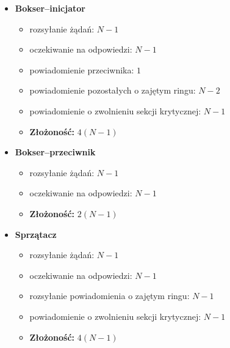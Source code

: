 \documentclass{article}
\begin{document}
\begin{itemize}
\item \textbf{Bokser--inicjator}
  \begin{itemize}
  \item rozsyłanie żądań: $N - 1$
  \item oczekiwanie na odpowiedzi: $N - 1$
  \item powiadomienie przeciwnika: $1$
  \item powiadomienie pozostałych o zajętym ringu: $N - 2$
  \item powiadomienie o zwolnieniu sekcji krytycznej: $N - 1$
  \item \textbf{Złożoność:} $4(N - 1)$
  \end{itemize}
\item \textbf{Bokser--przeciwnik}
  \begin{itemize}
  \item rozsyłanie żądań: $N - 1$
  \item oczekiwanie na odpowiedzi: $N - 1$
  \item \textbf{Złożoność:} $2(N - 1)$
  \end{itemize}
\item \textbf{Sprzątacz}
  \begin{itemize}
  \item rozsyłanie żądań: $N - 1$
  \item oczekiwanie na odpowiedzi: $N - 1$
  \item rozsyłanie powiadomienia o zajętym ringu: $N - 1$
  \item powiadomienie o zwolnieniu sekcji krytycznej: $N - 1$
  \item \textbf{Złożoność:} $4(N - 1)$
  \end{itemize}
\end{itemize}
\end{document}
